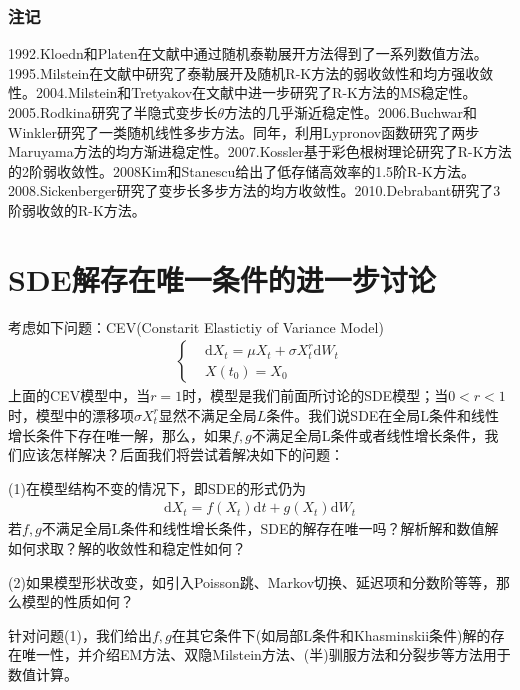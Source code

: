         \subsubsection{注记}
            1992.Kloedn和Platen在文献\cite{1992.Kloeden}中通过随机泰勒展开方法得到了一系列数值方法。1995.Milstein在文献\cite{1995.Milstein}中研究了泰勒展开及随机R-K方法的弱收敛性和均方强收敛性。2004.Milstein和Tretyakov在文献\cite{2004.Milstein}中进一步研究了R-K方法的MS稳定性。2005.Rodkina研究了半隐式变步长$\theta$方法的几乎渐近稳定性。2006.Buchwar和Winkler研究了一类随机线性多步方法。同年，利用Lypronov函数研究了两步Maruyama方法的均方渐进稳定性。2007.Kossler基于彩色根树理论研究了R-K方法的2阶弱收敛性。2008Kim和Stanescu给出了低存储高效率的1.5阶R-K方法。2008.Sickenberger研究了变步长多步方法的均方收敛性。2010.Debrabant研究了3阶弱收敛的R-K方法。

\section{SDE解存在唯一条件的进一步讨论}
    \par
    考虑如下问题：CEV(Constarit Elastictiy of Variance Model)
    \begin{align*}
        \left\{
            \begin{aligned}
            &\mathrm{d}X_t = \mu X_t + \sigma X_t^r \mathrm{d}W_t\\
            &X(t_0) = X_0
            \end{aligned}
        \right.
    \end{align*}
    上面的CEV模型中，当$r=1$时，模型是我们前面所讨论的SDE模型；当$0<r<1$时，模型中的漂移项$\sigma X_t^r$显然不满足全局$L$条件。我们说SDE在全局L条件和线性增长条件下存在唯一解，那么，如果$f,g$不满足全局L条件或者线性增长条件，我们应该怎样解决？后面我们将尝试着解决如下的问题：
    \par
    (1)在模型结构不变的情况下，即SDE的形式仍为
    \begin{align*}
        \mathrm{d}X_t = f(X_t)\mathrm{d}t + g(X_t)\mathrm{d}W_t
    \end{align*}
    若$f,g$不满足全局L条件和线性增长条件，SDE的解存在唯一吗？解析解和数值解如何求取？解的收敛性和稳定性如何？
    \par
    (2)如果模型形状改变，如引入Poisson跳、Markov切换、延迟项和分数阶等等，那么模型的性质如何？
    \par
    针对问题(1)，我们给出$f,g$在其它条件下(如局部L条件和Khasminskii条件)解的存在唯一性，并介绍EM方法、双隐Milstein方法、(半)驯服方法和分裂步等方法用于数值计算。
